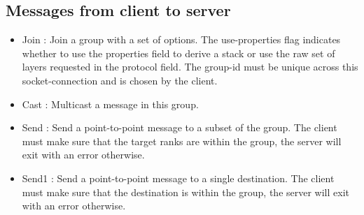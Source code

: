 \subsection{Messages from client to server}
\begin{itemize}
\item{Join} : Join a group with a set of options. The use-properties
  flag indicates whether to use the properties field to derive a stack
  or use the raw set of layers requested in the protocol field. The
  group-id must be unique across this socket-connection and is
  chosen by the client. 
\begin{FormatTable}
\end{FormatTable}

\item{Cast} : Multicast a message in this group.
\begin{FormatTable}
\end{FormatTable}

\item{Send} : Send a point-to-point message to a subset of the
  group. The client must make sure that the target ranks are within
  the group, the server will exit with an error otherwise. 
\begin{FormatTable}
\end{FormatTable}


\item{Send1} : Send a point-to-point message to a single destination. 
The client must make sure that the destination is within
  the group, the server will exit with an error otherwise. 
\begin{FormatTable}
\end{FormatTable}


\end{itemize}
